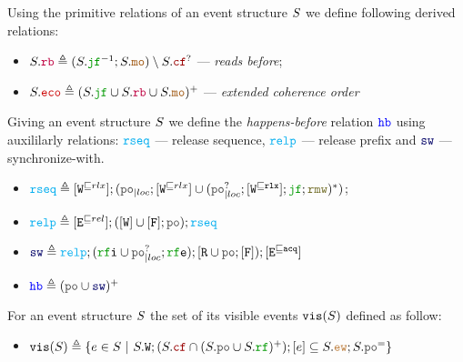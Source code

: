 \documentclass[12pt]{article}
\begin{document}
\begin{definition}
  Using the primitive relations of an event structure $S$ we define following derived relations:
  \begin{itemize}
    \item $\lES.\lRB \defeq (\lES.\lJF^{-1};\lES.\lMO) \setminus \lES.\lCF^?$ --- 
      \emph{reads before};
    \item $\lES.\lECO \defeq (\lES.\lJF \cup \lES.\lRB \cup \lES.\lMO)^+$ --- 
      \emph{extended coherence order}
  \end{itemize}
\end{definition}

\begin{definition}
  Giving an event structure $S$ we define the \emph{happens-before} relation $\lHB$
  using auxililarly relations: 
  $\lRSEQ$ --- release sequence,
  $\lRELP$ --- release prefix and
  $\lSW$ --- synchronize-with.
  \begin{itemize}
  \item $\lRSEQ \defeq [\lWsqeq{rlx}];(\lmakeLoc{\lPO};[\lWsqeq{rlx}] \cup 
    (\lmakeLoc{\lPO^?};[\lWsqeq{\rlx}];\lJF;\lRMW)^*)$;
  \item $\lRELP \defeq [\lEsqeq{rel}];([\lW] \cup [\lF];\lPO);\lRSEQ$
  \item $\lSW \defeq \lRELP; (\lRFI \cup \lmakeLoc{\lPO^?};\lRFE); [\lR \cup \lPO;[\lF]);[\lEsqeq{\acq}]$
  \item $\lHB \defeq (\lPO \cup \lSW)^+$
  \end{itemize}
\end{definition}

\begin{definition}
  For an event structure $S$ the set of its visible events ${\mathtt{vis}}(S)$ defined as follow:
  \begin{itemize}
    \item $\lVIS(\lES) \defeq 
      \{ e \in \lES ~|~ \lES.\lW;(\lES.\lCF \cap (\lES.\lPO \cup \lES.\lRF)^+);[e] \subseteq 
         \lES.\lEW;\lES.\lPO^=
      \}$
  \end{itemize}
\end{definition}
\end{document}
